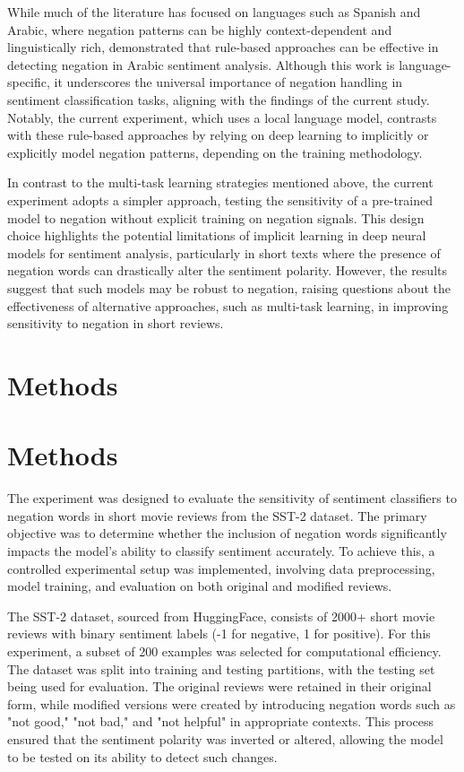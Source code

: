 \documentclass{article}
\begin{document}
While much of the literature has focused on languages such as Spanish and Arabic, where negation patterns can be highly context-dependent and linguistically rich, \cite{DBLP:journals/corr/abs-2107-11597} demonstrated that rule-based approaches can be effective in detecting negation in Arabic sentiment analysis. Although this work is language-specific, it underscores the universal importance of negation handling in sentiment classification tasks, aligning with the findings of the current study. Notably, the current experiment, which uses a local language model, contrasts with these rule-based approaches by relying on deep learning to implicitly or explicitly model negation patterns, depending on the training methodology.

In contrast to the multi-task learning strategies mentioned above, the current experiment adopts a simpler approach, testing the sensitivity of a pre-trained model to negation without explicit training on negation signals. This design choice highlights the potential limitations of implicit learning in deep neural models for sentiment analysis, particularly in short texts where the presence of negation words can drastically alter the sentiment polarity. However, the results suggest that such models may be robust to negation, raising questions about the effectiveness of alternative approaches, such as multi-task learning, in improving sensitivity to negation in short reviews.
\section{Methods}
\section{Methods}

The experiment was designed to evaluate the sensitivity of sentiment classifiers to negation words in short movie reviews from the SST-2 dataset. The primary objective was to determine whether the inclusion of negation words significantly impacts the model's ability to classify sentiment accurately. To achieve this, a controlled experimental setup was implemented, involving data preprocessing, model training, and evaluation on both original and modified reviews.

The SST-2 dataset, sourced from HuggingFace, consists of 2000+ short movie reviews with binary sentiment labels (-1 for negative, 1 for positive). For this experiment, a subset of 200 examples was selected for computational efficiency. The dataset was split into training and testing partitions, with the testing set being used for evaluation. The original reviews were retained in their original form, while modified versions were created by introducing negation words such as "not good," "not bad," and "not helpful" in appropriate contexts. This process ensured that the sentiment polarity was inverted or altered, allowing the model to be tested on its ability to detect such changes.
\end{document}
